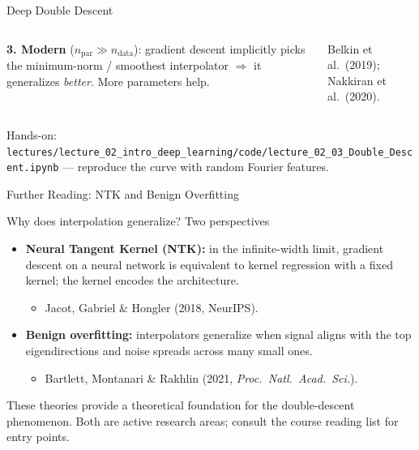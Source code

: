 \documentclass[aspectratio=169,11pt]{beamer}
\newcommand{\emphc}[1]{\textcolor{harvardcrimson}{#1}}
\begin{document}
\begin{frame}[shrink=12]{Deep Double Descent}
\begin{columns}[T]
{\vspace{0.06cm}
\textcolor{softgreen}{\textbf{3. Modern}} ($n_\text{par}\!\gg\!n_\text{data}$): gradient descent implicitly picks the \emphc{minimum-norm / smoothest} interpolator $\Rightarrow$ it generalizes \emph{better}. More parameters help.

\vspace{0.08cm}
{\scriptsize Belkin et al.\ (2019); Nakkiran et al.\ (2020).}}
\end{columns}

\vspace{0.05cm}
{\footnotesize\emphc{Hands-on:} \texttt{lectures/lecture\_02\_intro\_deep\_learning/code/lecture\_02\_03\_Double\_Descent.ipynb} --- reproduce the curve with random Fourier features.}
\end{frame}

\begin{frame}{Further Reading: NTK and Benign Overfitting}
\begin{block}{Why does interpolation generalize? Two perspectives}
\begin{itemize}
    \item \textbf{Neural Tangent Kernel (NTK):} in the infinite-width limit, gradient descent on a neural network is equivalent to kernel regression with a fixed kernel; the kernel encodes the architecture.
    \begin{itemize}
        \item Jacot, Gabriel \& Hongler (2018, NeurIPS).
    \end{itemize}
    \item \textbf{Benign overfitting:} interpolators generalize when signal aligns with the top eigendirections and noise spreads across many small ones.
    \begin{itemize}
        \item Bartlett, Montanari \& Rakhlin (2021, \textit{Proc.\ Natl.\ Acad.\ Sci.}).
    \end{itemize}
\end{itemize}
\end{block}
\vspace{0.2cm}
{\footnotesize These theories provide a theoretical foundation for the double-descent phenomenon. Both are active research areas; consult the course reading list for entry points.}
\end{frame}

\end{document}
